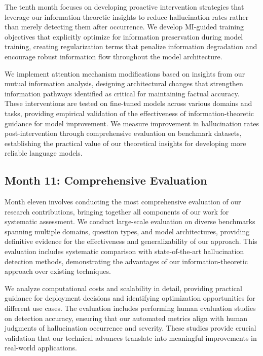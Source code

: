 \documentclass[11pt, oneside]{book}
\theoremstyle{plain}
\theoremstyle{definition}
\theoremstyle{remark}
\begin{document}
The tenth month focuses on developing proactive intervention strategies that leverage our information-theoretic insights to reduce hallucination rates rather than merely detecting them after occurrence. We develop MI-guided training objectives that explicitly optimize for information preservation during model training, creating regularization terms that penalize information degradation and encourage robust information flow throughout the model architecture.

We implement attention mechanism modifications based on insights from our mutual information analysis, designing architectural changes that strengthen information pathways identified as critical for maintaining factual accuracy. These interventions are tested on fine-tuned models across various domains and tasks, providing empirical validation of the effectiveness of information-theoretic guidance for model improvement. We measure improvement in hallucination rates post-intervention through comprehensive evaluation on benchmark datasets, establishing the practical value of our theoretical insights for developing more reliable language models.

\subsection{Month 11: Comprehensive Evaluation}

Month eleven involves conducting the most comprehensive evaluation of our research contributions, bringing together all components of our work for systematic assessment. We conduct large-scale evaluation on diverse benchmarks spanning multiple domains, question types, and model architectures, providing definitive evidence for the effectiveness and generalizability of our approach. This evaluation includes systematic comparison with state-of-the-art hallucination detection methods, demonstrating the advantages of our information-theoretic approach over existing techniques.

We analyze computational costs and scalability in detail, providing practical guidance for deployment decisions and identifying optimization opportunities for different use cases. The evaluation includes performing human evaluation studies on detection accuracy, ensuring that our automated metrics align with human judgments of hallucination occurrence and severity. These studies provide crucial validation that our technical advances translate into meaningful improvements in real-world applications.
\end{document}

